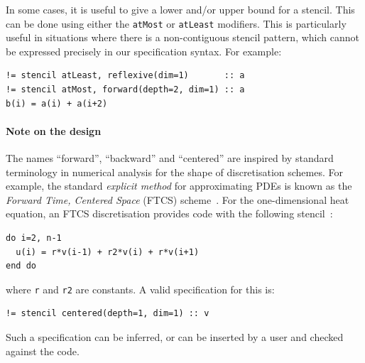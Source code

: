 \documentclass[9pt,preprint]{sigplanconf}
\theoremstyle{definition}
\newcommand{\eg}{\emph{e.g.}}
\newcommand{\term}[1]{\texttt{#1}}
\begin{document}
%
%


In some cases, it is useful to give a lower and/or upper bound for a
stencil. This can be done using either the \term{atMost} or
\term{atLeast} modifiers. This is particularly useful in situations
where there is a non-contiguous stencil pattern, which cannot be expressed
precisely in our specification syntax. For example:
\begin{verbatim}
!= stencil atLeast, reflexive(dim=1)       :: a
!= stencil atMost, forward(depth=2, dim=1) :: a
b(i) = a(i) + a(i+2)
\end{verbatim}

\paragraph{Note on the design}

The names ``forward'', ``backward'' and ``centered''
are inspired by standard terminology in numerical analysis
for the shape of discretisation schemes. For example,
the standard \emph{explicit method} for approximating
PDEs is known as the \emph{Forward Time, Centered Space} (FTCS)
scheme~\cite{dawson1991finite}. For
the one-dimensional heat equation, an FTCS discretisation
provides code with the following stencil~\cite{recktenwald2004finite}:
\begin{verbatim}
do i=2, n-1
  u(i) = r*v(i-1) + r2*v(i) + r*v(i+1)
end do
\end{verbatim}
where \texttt{r} and \texttt{r2} are constants.
A valid specification for this is:
\begin{verbatim}
!= stencil centered(depth=1, dim=1) :: v
\end{verbatim}
Such a specification can be inferred, or can be inserted by a user
and checked against the code.
\end{document}
